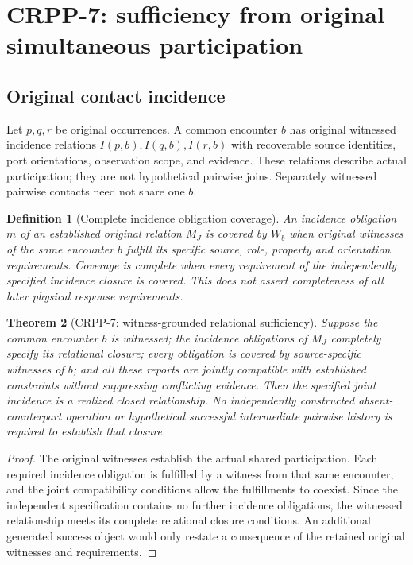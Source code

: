 \documentclass[11pt]{article}
\newtheorem{definition}{Definition}[section]
\newtheorem{theorem}[definition]{Theorem}
\begin{document}
\section{CRPP-7: sufficiency from original simultaneous participation}
\subsection{Original contact incidence}
Let $p,q,r$ be original occurrences. A common encounter $b$
has original witnessed incidence relations $I(p,b),I(q,b),I(r,b)$
with recoverable source identities, port orientations,
observation scope, and evidence. These relations describe
actual participation; they are not hypothetical pairwise joins.
Separately witnessed pairwise contacts need not share one $b$.

\begin{definition}[Complete incidence obligation coverage]
An incidence obligation $m$ of an established original
relation $M_J$ is covered by $W_b$ when original witnesses
of the \emph{same} encounter $b$ fulfill its specific
source, role, property and orientation requirements.
Coverage is complete when every requirement of the
independently specified \emph{incidence closure} is covered.
This does not assert completeness of all later physical
response requirements.
\end{definition}

\begin{theorem}[CRPP-7: witness-grounded relational sufficiency]
Suppose the common encounter $b$ is witnessed; the
incidence obligations of $M_J$ completely specify its
relational closure; every obligation is covered by
source-specific witnesses of $b$; and all these reports
are jointly compatible with established constraints
without suppressing conflicting evidence. Then the
specified joint incidence is a realized closed relationship.
No independently constructed absent-counterpart operation
or hypothetical successful intermediate pairwise history
is required to establish that closure.
\end{theorem}
\begin{proof}
The original witnesses establish the actual shared
participation. Each required incidence obligation is
fulfilled by a witness from that same encounter, and
the joint compatibility conditions allow the fulfillments
to coexist. Since the independent specification contains
no further incidence obligations, the witnessed
relationship meets its complete relational closure
conditions. An additional generated success object
would only restate a consequence of the retained original
witnesses and requirements.
\end{proof}
\end{document}
